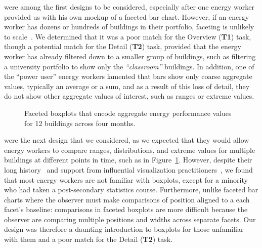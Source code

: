 \documentclass[journal]{vgtc}                %
\newcommand{\bqstart}[1]{\vspace{1mm} \noindent{\textbf{#1}}}
\begin{document}
\bqstart{Faceted bar charts} were among the first designs to be considered, especially after one energy worker provided us with his own mockup of a faceted bar chart.
However, if an energy worker has dozens or hundreds of buildings in their portfolio, faceting is unlikely to scale~\cite{Javed2010}. 
We determined that it was a poor match for the Overview ({\bf T1}) task, though a potential match for the Detail ({\bf T2}) task, provided that the energy worker has already filtered down to a smaller group of buildings, such as filtering a university portfolio to show only the {\it ``classroom''} buildings.
In addition, one of the ``power user'' energy workers lamented that bars show only coarse aggregate values, typically an average or a sum, and as a result of this loss of detail, they do not show other aggregate values of interest, such as ranges or extreme values.

\begin{figure}[ht]
	\centering
	\vspace{-0.15cm}
	\caption{Faceted boxplots that encode aggregate energy performance values for 12 buildings across four months.}
	\label{fig:sandbox-faceted-boxplot}
	\vspace{-0.6cm}
\end{figure} 

\bqstart{Faceted boxplots} were the next design that we considered, as we expected that they would allow energy workers to compare ranges, distributions, and extreme values for multiple buildings at different points in time, such as in Figure~\ref{fig:sandbox-faceted-boxplot}.
However, despite their long history~\cite{Wickham2011} and support from influential visualization practitioners~\cite{Few2014}, we found that most energy workers are not familiar with boxplots, except for a minority who had taken a post-secondary statistics course.
Furthermore, unlike faceted bar charts where the observer must make comparisons of position aligned to a each facet's baseline: comparisons in faceted boxplots are more difficult because the observer are comparing multiple positions and widths across separate facets. 
Our design was therefore a daunting introduction to boxplots for those unfamiliar with them and a poor match for the Detail ({\bf T2}) task.
\end{document}
